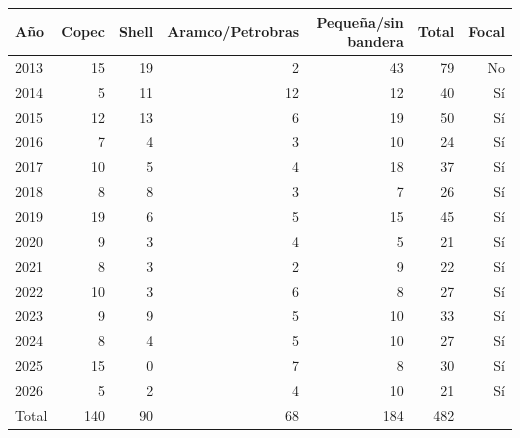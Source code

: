 \begin{tabular}{lrrrrrr}
\toprule
Año & Copec & Shell & Aramco/Petrobras & Pequeña/sin bandera & Total & Focal \\
\midrule
2013 & 15 & 19 & 2 & 43 & 79 & No \\
2014 & 5 & 11 & 12 & 12 & 40 & Sí \\
2015 & 12 & 13 & 6 & 19 & 50 & Sí \\
2016 & 7 & 4 & 3 & 10 & 24 & Sí \\
2017 & 10 & 5 & 4 & 18 & 37 & Sí \\
2018 & 8 & 8 & 3 & 7 & 26 & Sí \\
2019 & 19 & 6 & 5 & 15 & 45 & Sí \\
2020 & 9 & 3 & 4 & 5 & 21 & Sí \\
2021 & 8 & 3 & 2 & 9 & 22 & Sí \\
2022 & 10 & 3 & 6 & 8 & 27 & Sí \\
2023 & 9 & 9 & 5 & 10 & 33 & Sí \\
2024 & 8 & 4 & 5 & 10 & 27 & Sí \\
2025 & 15 & 0 & 7 & 8 & 30 & Sí \\
2026 & 5 & 2 & 4 & 10 & 21 & Sí \\
Total & 140 & 90 & 68 & 184 & 482 &  \\
\bottomrule
\end{tabular}
